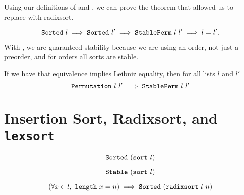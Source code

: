 \documentclass[11pt]{thesis}
\begin{document}
Using our definitions of  and , we can
prove the theorem that allowed us to replace  with
radixsort.

\begin{theorem}
  \begin{equation*}
    \texttt{Sorted}~l \implies \texttt{Sorted}~l' \implies
    \texttt{StablePerm}~l~l' \implies l = l'.
  \end{equation*}
\end{theorem}

With , we are guaranteed stability because we are using
an order, not just a preorder, and for orders all sorts are stable.

\begin{theorem}
  If we have that equivalence implies Leibniz equality, then for all
  lists $l$ and $l'$
  \begin{equation*}
      \texttt{Permutation}~l~l' \implies \texttt{StablePerm}~l~l'
  \end{equation*}
\end{theorem}

\section{Insertion Sort, Radixsort, and \texttt{lexsort}}
\label{sec:sort}



\begin{theorem}
  \begin{equation*}
    \texttt{Sorted}~(\texttt{sort}~l)
  \end{equation*}
\end{theorem}

\begin{theorem}
  \begin{equation*}
    \texttt{Stable}~(\texttt{sort}~l)
  \end{equation*}
\end{theorem}



\begin{theorem}
  \begin{equation*}
    (\forall x \in l,~\texttt{length}~x = n) \implies \texttt{Sorted}~(\texttt{radixsort}~l~n)
  \end{equation*}
\end{theorem}
\end{document}
